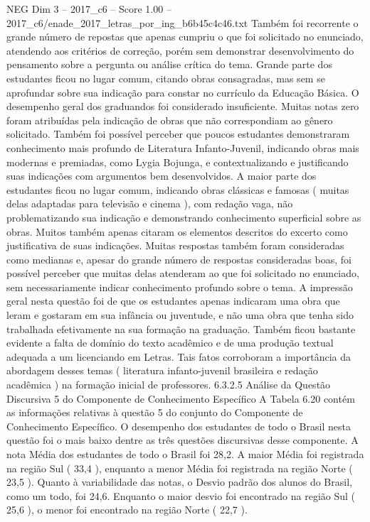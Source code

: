 \begin{textsample}{NEG Dim 3 – 2017\_c6 – Score 1.00 – 2017\_c6/enade\_2017\_letras\_por\_ing\_b6b45c4c46.txt}
Também foi recorrente o grande número de repostas que apenas cumpriu o que foi solicitado no enunciado, atendendo aos critérios de correção, porém sem demonstrar desenvolvimento do pensamento sobre a pergunta ou análise crítica do tema.
Grande parte dos estudantes ficou no lugar comum, citando obras consagradas, mas sem se aprofundar sobre sua indicação para constar no currículo da Educação Básica.
O desempenho geral dos graduandos foi considerado insuficiente.
Muitas notas zero foram atribuídas pela indicação de obras que não correspondiam ao gênero solicitado.
Também foi possível perceber que poucos estudantes demonstraram conhecimento mais profundo de Literatura Infanto-Juvenil, indicando obras mais modernas e premiadas, como Lygia Bojunga, e contextualizando e justificando suas indicações com argumentos bem desenvolvidos.
A maior parte dos estudantes ficou no lugar comum, indicando obras clássicas e famosas ( muitas delas adaptadas para televisão e cinema ), com redação vaga, não problematizando sua indicação e demonstrando conhecimento superficial sobre as obras.
Muitos também apenas citaram os elementos descritos do excerto como justificativa de suas indicações.
Muitas respostas também foram consideradas como medianas e, apesar do grande número de respostas consideradas boas, foi possível perceber que muitas delas atenderam ao que foi solicitado no enunciado, sem necessariamente indicar conhecimento profundo sobre o tema.
A impressão geral nesta questão foi de que os estudantes apenas indicaram uma obra que leram e gostaram em sua infância ou juventude, e não uma obra que tenha sido trabalhada efetivamente na sua formação na graduação.
Também ficou bastante evidente a falta de domínio do texto acadêmico e de uma produção textual adequada a um licenciando em Letras.
Tais fatos corroboram a importância da abordagem desses temas ( literatura infanto-juvenil brasileira e redação acadêmica ) na formação inicial de professores. 6.3.2.5 Análise da Questão Discursiva 5 do Componente de Conhecimento Específico A Tabela 6.20 contém as informações relativas à questão 5 do conjunto do Componente de Conhecimento Específico.
O desempenho dos estudantes de todo o Brasil nesta questão foi o mais baixo dentre as três questões discursivas desse componente.
A nota Média dos estudantes de todo o Brasil foi 28,2.
A maior Média foi registrada na região Sul ( 33,4 ), enquanto a menor Média foi registrada na região Norte ( 23,5 ).
Quanto à variabilidade das notas, o Desvio padrão dos alunos do Brasil, como um todo, foi 24,6.
Enquanto o maior desvio foi encontrado na região Sul ( 25,6 ), o menor foi encontrado na região Norte ( 22,7 ).

\end{textsample}
